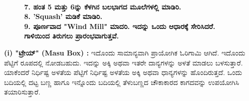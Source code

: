 \begin{figure}[H]
\\
\textbf{7. ಹಂತ 5 ಮತ್ತು 6ನ್ನು ಕೆಳಗಿನ ಬಲಭಾಗದ ಮೂಲೆಗಳಲ್ಲಿ ಮಾಡಿರಿ.}\\
\textbf{8. 'Squash' ಮಡಿಕೆ ಮಾಡಿರಿ.}\\
\textbf{9. ಪೂರ್ಣವಾದ "Wind Mill" ಮಾದರಿ. ಇದನ್ನು ಒಂದು ಆಧಾರಕ್ಕೆ ಸೇರಿಸಿದರೆ. ಗಾಳಿಯಿಂದ ತಿರುಗಲು ಪ್ರಾರಂಭವಾಗುತ್ತವೆ.}
\end{figure}

\noindent
\textbf{(i) "ಟ್ರೇಯ್" (Masu Box) : } ಇದೊಂದು ಸಾಮಾನ್ಯವಾಗಿ ಪ್ರಾಯೋಗಿಕ ಓರಿಗಾಮಿ ಆಗಿದೆ. ಇದೊಂದು ಪೆಟ್ಟಿಗೆ ರೂಪದಲ್ಲಿ ನೋಡಬಹುದು. ಇದನ್ನು ಅಕ್ಕಿ ಅಥವಾ ಇತರೇ ದಾನ್ಯಗಳನ್ನು ಅಳತೆ ಮಾಡಲು ಬಳಸುತ್ತಾರೆ. ಯಾಕೆಂದರೆ ನಿರ್ಧಿಷ್ಟ ಅಳತೆಯ ಪೆಟ್ಟಿಗೆ ನಿರ್ಧಿಷ್ಟ ಅಳತೆಯ ಅಕ್ಕಿ ಅಥವಾ ಧಾನ್ಯಗಳನ್ನು ಹೊಂದಿರುತ್ತದೆ. ಒಂದು ಬದಿಯಲ್ಲಿ ದಟ್ಟ ಬಣ್ಣ ಹಾಗೂ \hbox{ಇನ್ನೊಂದು} ಬದಿಯಲ್ಲಿ ತೆಳುಬಣ್ಣದ ಚೌಕಾಕಾರದ ಕಾಗದವನ್ನು ಉಪಯೋಗಿಸಿ ತಯಾರಿಸುತ್ತಾರೆ.
\begin{figure}[H]
\end{figure}

